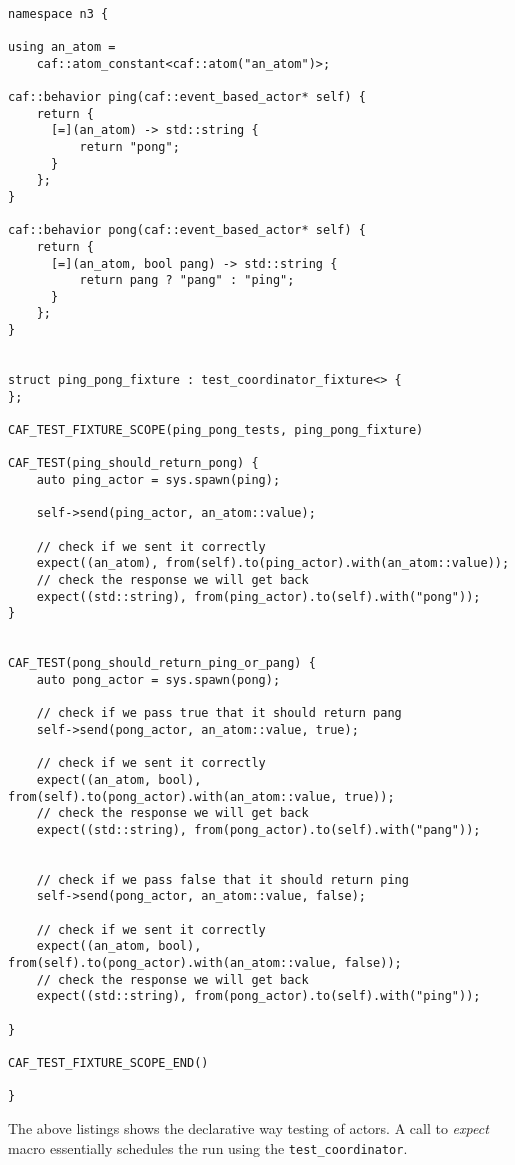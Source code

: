 \begin{lstlisting}

namespace n3 {
    
using an_atom =
    caf::atom_constant<caf::atom("an_atom")>;
    
caf::behavior ping(caf::event_based_actor* self) {
    return {
      [=](an_atom) -> std::string {
          return "pong";
      }  
    };
}
    
caf::behavior pong(caf::event_based_actor* self) {
    return {
      [=](an_atom, bool pang) -> std::string {
          return pang ? "pang" : "ping";
      }  
    };
}
    
    
struct ping_pong_fixture : test_coordinator_fixture<> {
};
    
CAF_TEST_FIXTURE_SCOPE(ping_pong_tests, ping_pong_fixture)

CAF_TEST(ping_should_return_pong) {
    auto ping_actor = sys.spawn(ping);
    
    self->send(ping_actor, an_atom::value);
    
    // check if we sent it correctly
    expect((an_atom), from(self).to(ping_actor).with(an_atom::value));
    // check the response we will get back
    expect((std::string), from(ping_actor).to(self).with("pong"));
}
    

CAF_TEST(pong_should_return_ping_or_pang) {
    auto pong_actor = sys.spawn(pong);
    
    // check if we pass true that it should return pang
    self->send(pong_actor, an_atom::value, true);
    
    // check if we sent it correctly
    expect((an_atom, bool), from(self).to(pong_actor).with(an_atom::value, true));
    // check the response we will get back
    expect((std::string), from(pong_actor).to(self).with("pang"));
    
        
    // check if we pass false that it should return ping
    self->send(pong_actor, an_atom::value, false);
    
    // check if we sent it correctly
    expect((an_atom, bool), from(self).to(pong_actor).with(an_atom::value, false));
    // check the response we will get back
    expect((std::string), from(pong_actor).to(self).with("ping"));
    
}

CAF_TEST_FIXTURE_SCOPE_END()
    
}

\end{lstlisting}

The above listings shows the declarative way testing of actors.
A call to \emph{expect} macro essentially schedules the run using the \lstinline^test_coordinator^. 
